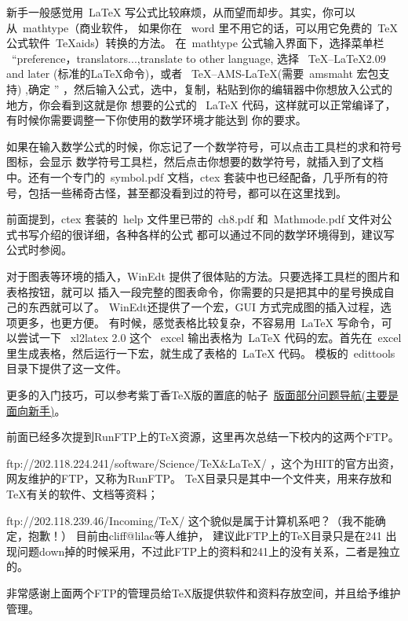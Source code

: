 
新手一般感觉用~LaTeX 写公式比较麻烦，从而望而却步。其实，你可以从~mathtype（商业软件，
如果你在~ word 里不用它的话，可以用它免费的~TeX 公式软件~TeXaids）转换的方法。
在~mathtype 公式输入界面下，选择菜单栏 ~``preference，translators...,translate to other language,
选择~ TeX--LaTeX2.09 and later (标准的LaTeX命令)，或者~ TeX--AMS-LaTeX(需要~amsmaht 宏包支持) ,确定 ''
，然后输入公式，选中，复制，粘贴到你的编辑器中你想放入公式的地方，你会看到这就是你
想要的公式的~ LaTeX  代码，这样就可以正常编译了，有时候你需要调整一下你使用的数学环境才能达到
你的要求。

如果在输入数学公式的时候，你忘记了一个数学符号，可以点击工具栏的求和符号图标，会显示
数学符号工具栏，然后点击你想要的数学符号，就插入到了文档中。还有一个专门的~symbol.pdf 文档，ctex
套装中也已经配备，几乎所有的符号，包括一些稀奇古怪，甚至都没看到过的符号，都可以在这里找到。

前面提到，ctex 套装的~help 文件里已带的~ch8.pdf 和~Mathmode.pdf 文件对公式书写介绍的很详细，各种各样的公式
都可以通过不同的数学环境得到，建议写公式时参阅。


对于图表等环境的插入，WinEdt 提供了很体贴的方法。只要选择工具栏的图片和表格按钮，就可以
插入一段完整的图表命令，你需要的只是把其中的星号换成自己的东西就可以了。
WinEdt还提供了一个宏，GUI 方式完成图的插入过程，选项更多，也更方便。
有时候，感觉表格比较复杂，不容易用~LaTeX 写命令，可以尝试一下 ~xl2latex 2.0 这个~ excel
输出表格为~LaTeX 代码的宏。首先在~excel 里生成表格，然后运行一下宏，就生成了表格的~LaTeX 代码。
模板的~edittools 目录下提供了这一文件。


更多的入门技巧，可以参考紫丁香TeX版的置底的帖子~\href{http://bbs.hit.edu.cn/bbscon.php?board=TeX&id=2038&ftype=11}{版面部分问题导航(主要是面向新手)}。

前面已经多次提到RunFTP上的TeX资源，这里再次总结一下校内的这两个FTP。
\begin{hitlist}
  \item ftp://202.118.224.241/software/Science/TeX\&LaTeX/  ，这个为HIT的官方出资，网友维护的FTP，又称为RunFTP。
  TeX目录只是其中一个文件夹，用来存放和TeX有关的软件、文档等资料；
  \item ftp://202.118.239.46/Incoming/TeX/  这个貌似是属于计算机系吧？（我不能确定，抱歉！） 目前由cliff@lilac等人维护，
建议此FTP上的TeX目录只是在241 出现问题down掉的时候采用，不过此FTP上的资料和241上的没有关系，二者是独立的。
\end{hitlist}

非常感谢上面两个FTP的管理员给TeX版提供软件和资料存放空间，并且给予维护管理。
